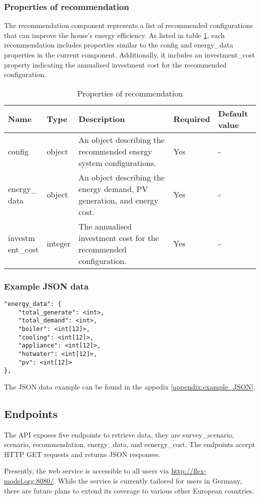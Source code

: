 \subsubsection{Properties of recommendation}

The recommendation component represents a list of recommended configurations that can improve the house's energy efficiency. 
As listed in table \ref{tab:properties_recommendation}, each recommendation includes properties similar to the config and energy\_data properties in the current component. 
Additionally, it includes an investment\_cost property indicating the annualised investment cost for the recommended configuration. 

\begin{table}[h!]
    \centering
    \small
    \begin{tabular}{ | p{} | p{} | p{} | p{} | p{} | } 
    \hline
    Name & Type & Description & Required & Default value \\
    \hline
    config & object & An object describing the recommended energy system configurations. & Yes & - \\
    \hline
    \makecell{energy\_\\data} & object & An object describing the energy demand, PV generation, and energy cost. & Yes & - \\
    \hline
    \makecell{investm\\ent\_cost} & integer & The annualised investment cost for the recommended configuration. & Yes & - \\
    \hline
    \end{tabular}
    \caption{Properties of recommendation}
    \label{tab:properties_recommendation}
\end{table}


\subsubsection{Example JSON data}

\begin{verbatim}
"energy_data": {
    "total_generate": <int>,
    "total_demand": <int>,
    "boiler": <int[12]>,
    "cooling": <int[12]>,
    "appliance": <int[12]>,
    "hotwater": <int[12]>,
    "pv": <int[12]>
},
\end{verbatim}

The JSON data example can be found in the appedix \ref{appendix:example_JSON}. 

\subsection{Endpoints}

The API exposes five endpoints to retrieve data,
they are survey\_scenario, scenario, recommendation, energy\_data, and eenergy\_cost.
The endpoints accept HTTP GET requests and returns JSON responses. 


Presently, the web service is accessible to all users via \url{http://flex-model.org:8080/}. 
While the service is currently tailored for users in Germany, there are future plans to extend its coverage to various other European countries. 